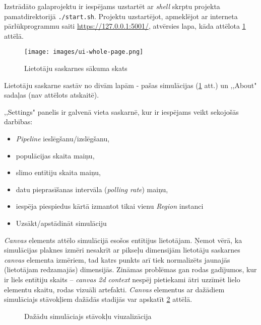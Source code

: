 

Izstrādāto galaprojektu ir iespējams uzstartēt ar \emph{shell} skrptu projekta
pamatdirektorijā \texttt{./start.sh}.
Projektu uzstartējot, apmeklējot ar interneta pārlūkprogrammu saiti
\url{https://127.0.0.1:5001/}, atvērsies lapa, kāda attēlota \ref{img:whole-ui} attēlā.

\begin{figure}[H]
	\centering
	\texttt{[image: images/ui-whole-page.png]}
	\caption{Lietotāju saskarnes sākuma skats}
	\label{img:whole-ui}
\end{figure}

Lietotāju saskarne sastāv no divām lapām - pašas simulācijas (\ref{img:whole-ui}
att.) un ,,About" sadaļas (nav attēlots atskaitē).


,,Settings" panelis ir galvenā vieta saskarnē, kur ir iespējams veikt sekojošās darbības:

\begin{itemize}
    \item \emph{Pipeline} ieslēgšanu/izslēgšanu,
    \item populācijas skaita maiņu,
    \item slimo entītiju skaita maiņu,
    \item datu pieprasīšanas intervāla (\emph{polling rate}) maiņu,
    \item iespēja piespiedus kārtā izmantot tikai vienu \emph{Region} instanci
    \item Uzsākt/apstādināt simulāciju
\end{itemize}


\emph{Canvas} elements attēlo simulācijā esošos entītijus lietotājam. Ņemot vērā, ka
simulācijas plaknes izmēri nesakrīt ar pikseļu dimensijām lietotāju saskarnes
\emph{canvas} elementa izmēriem, tad katrs punkts arī tiek normalizēts jaunajās
(lietotājam redzamajās) dimensijās. Zināmas problēmas gan rodas gadījumos, kur
ir liels entītiju skaits -- \emph{canvas 2d context} nespēj pietiekami ātri
uzzīmēt lielo elementu skaitu, rodas vizuāli artefakti. \emph{Canvas} elementus
ar dažādiem simulāciajs stāvokļiem dažādās stadijās var apskatīt \ref{img:canvas-show-off} attēlā.

\begin{figure}[H]%
    \centering
    \qquad
    \qquad
    \caption{Dažādu simulāciajs stāvokļu viuzalizācija}%
    \label{img:canvas-show-off}%
\end{figure}




